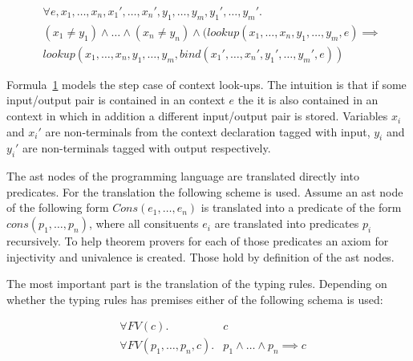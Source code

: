 \begin{figure}
\begin{multline}
  \forall e, x_1, \dots, x_n, x_1', \dots, x_n', y_1, \dots, y_m,
  y_1', \dots,
  y_m' . \\
  (x_1 \neq y_1) \land \dots \land (x_n \neq y_n) \land (lookup(x_1,
  \dots, x_n, y_1, \dots, y_m, e) \implies \\ lookup(x_1, \dots, x_n,
  y_1, \dots, y_m, bind(x_1',\dots,x_n',y_1',\dots,y_m',e))
\end{multline}
\label{formula:context-step}
\end{figure}

Formula~\ref{formula:context-step} models the step case of
context look-ups. The intuition is that if some input/output pair
is contained in an context $e$ the it is also contained in an
context in which in addition a different input/output pair is
stored. Variables $x_i$ and $x_i'$ are non-terminals from the
context declaration tagged with input, $y_i$ and $y_i'$ are
non-terminals tagged with output respectively.

The \gls{ast} nodes of the programming language are translated directly into
predicates. For the translation the following scheme is used. Assume
an \gls{ast} node of the following form $Cons(e_1, \dots, e_n)$ is
translated into a predicate of the form $cons(p_1, \dots, p_n)$, where
all consituents $e_i$ are translated into predicates $p_i$
recursively. To help theorem provers for each of those predicates an
axiom for injectivity and univalence is created. Those hold by
definition of the \gls{ast} nodes.

The most important part is the translation of the typing
rules. Depending on whether the typing rules has premises either of
the following schema is used:

\begin{figure}
\label{formula:typing-rule}
\begin{align}
  &\forall FV(c) .& c \\
  &\forall FV(p_1,\dots, p_n, c) .& p_1 \land \dots \land p_n \implies c
\end{align}
\end{figure}

